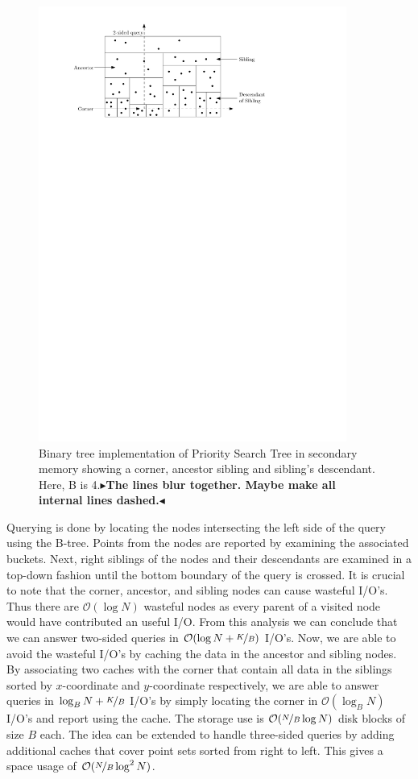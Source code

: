 \documentclass[twoside,11pt,openright]{report}
\newcommand{\todo}[1]{{\color[rgb]{.5,0,0}\textbf{$\blacktriangleright$#1$\blacktriangleleft$}}}
\begin{document}
\begin{figure}[h]
	\centering
		\includegraphics[width=0.9\textwidth]{../figures/ramaswamy_query}
	\caption{Binary tree implementation of Priority Search Tree in secondary memory showing a corner, ancestor sibling and sibling's descendant. Here, B is 4.\todo{The lines blur together. Maybe make all internal lines dashed.}}
	\label{fig:ramaswamy_query}
\end{figure}

Querying is done by locating the nodes intersecting the left side of the query using the B-tree. Points from the nodes are reported by examining the associated buckets. Next, right siblings of the nodes and their descendants are examined in a top-down fashion until the bottom boundary of the query is crossed. It is crucial to note that the corner, ancestor, and sibling nodes can cause wasteful I/O's. Thus there are $\mathcal{O}(\log N)$ wasteful nodes as every parent of a visited node would have contributed an useful I/O. From this analysis we can conclude that we can answer two-sided queries in $\mathcal{O}(\log N + \nicefrac{K}{B})$ I/O's. Now, we are able to avoid the wasteful I/O's by caching the data in the ancestor and sibling nodes. By associating two caches with the corner that contain all data in the siblings sorted by $x$-coordinate and $y$-coordinate respectively, we are able to answer queries in $\log_B N + \nicefrac{K}{B}$ I/O's by simply locating the corner in $\mathcal{O}(\log_B N)$ I/O's and report using the cache. The storage use is $\mathcal{O}(\nicefrac{N}{B} \log N)$ disk blocks of size $B$ each. The idea can be extended to handle three-sided queries by adding additional caches that cover point sets sorted from right to left. This gives a space usage of $\mathcal{O}(\nicefrac{N}{B} \log^2 N)$. 
\end{document}
